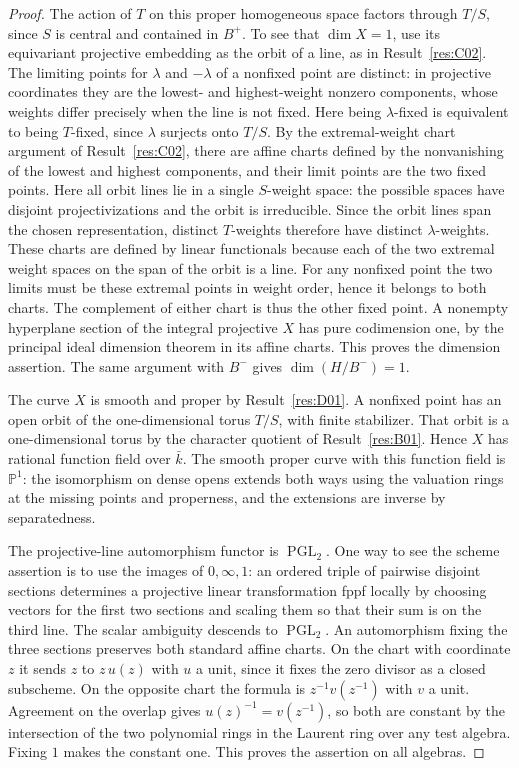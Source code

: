 \documentclass[11pt,a4paper,openany,oneside]{book}
\theoremstyle{resultstyle}
\theoremstyle{definition}
\numberwithin{equation}{chapter}
\begin{document}
\begin{proof}
The action of \(T\) on this proper homogeneous space factors
through \(T/S\), since \(S\) is central and contained in \(B^+\).
To see that \(\dim X=1\), use its equivariant projective
embedding as the orbit of a line, as in Result~\ref{res:C02}.
The limiting points for \(\lambda\) and \(-\lambda\) of a
nonfixed point are distinct: in projective coordinates they
are the lowest- and highest-weight nonzero components, whose
weights differ precisely when the line is not fixed.
Here being \(\lambda\)-fixed is equivalent to being \(T\)-fixed,
since \(\lambda\) surjects onto \(T/S\). By the extremal-weight
chart argument of Result~\ref{res:C02}, there are affine charts
defined by the nonvanishing of the lowest and highest
components, and their limit points are the two fixed points. Here
all orbit lines lie in a single \(S\)-weight space: the possible
spaces have disjoint projectivizations and the orbit is irreducible.
Since the orbit lines span the chosen representation, distinct
\(T\)-weights therefore have distinct \(\lambda\)-weights.
These charts are defined by linear functionals because each of
the two extremal weight spaces on the span of the orbit is a line.
For any nonfixed point the two limits must be these extremal
points in weight order, hence it belongs to both charts. The
complement of either chart is thus the other fixed point.
A nonempty hyperplane section of the integral projective
\(X\) has pure codimension one, by the principal ideal
dimension theorem in its affine charts. This proves the
dimension assertion. The same argument with \(B^-\) gives
\(\dim(H/B^-)=1\).

The curve \(X\) is smooth and proper by Result~\ref{res:D01}.
A nonfixed point has an open orbit of the one-dimensional
torus \(T/S\), with finite stabilizer. That orbit is a
one-dimensional torus by the character quotient of
Result~\ref{res:B01}. Hence \(X\) has rational function field
over \(\bar k\). The smooth proper curve with this function
field is \(\mathbb P^1\): the isomorphism on dense opens extends
both ways using the valuation rings at the missing points and
properness, and the extensions are inverse by separatedness.

The projective-line automorphism functor is
\(\operatorname{PGL}_2\). One way to see the scheme
assertion is to use the images of \(0,\infty,1\): an ordered
triple of pairwise disjoint sections determines a projective
linear transformation fppf locally by choosing vectors for the
first two sections and scaling them so that their sum is on the
third line. The scalar ambiguity descends to
\(\operatorname{PGL}_2\). An automorphism fixing the three
sections preserves both standard affine charts. On the chart
with coordinate \(z\) it sends \(z\) to \(z\,u(z)\) with
\(u\) a unit, since it fixes the zero divisor as a closed
subscheme. On the opposite chart the formula is
\(z^{-1}v(z^{-1})\) with \(v\) a unit. Agreement on the
overlap gives \(u(z)^{-1}=v(z^{-1})\), so both are constant
by the intersection of the two polynomial rings in the
Laurent ring over any test algebra. Fixing \(1\) makes
the constant one. This proves the assertion on all algebras.


\end{proof}
\end{document}
